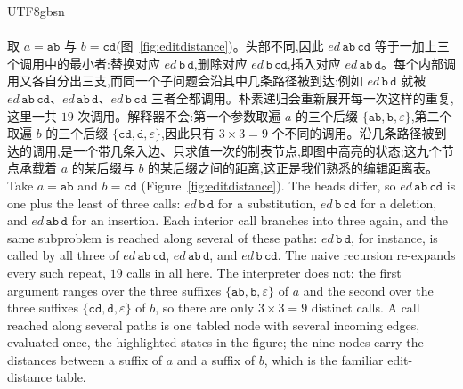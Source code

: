 \begin{CJK*}{UTF8}{gbsn}
  \paragraph{}
  \ifTablambdaChinese
  取 $a=\mathtt{ab}$ 与 $b=\mathtt{cd}$(图~\ref{fig:editdistance})。头部不同,因此 $\mathit{ed}\,\mathtt{ab}\,\mathtt{cd}$ 等于一加上三个调用中的最小者:替换对应 $\mathit{ed}\,\mathtt{b}\,\mathtt{d}$,删除对应 $\mathit{ed}\,\mathtt{b}\,\mathtt{cd}$,插入对应 $\mathit{ed}\,\mathtt{ab}\,\mathtt{d}$。每个内部调用又各自分出三支,而同一个子问题会沿其中几条路径被到达:例如 $\mathit{ed}\,\mathtt{b}\,\mathtt{d}$ 就被 $\mathit{ed}\,\mathtt{ab}\,\mathtt{cd}$、$\mathit{ed}\,\mathtt{ab}\,\mathtt{d}$、$\mathit{ed}\,\mathtt{b}\,\mathtt{cd}$ 三者全都调用。朴素递归会重新展开每一次这样的重复,这里一共 $19$ 次调用。解释器不会:第一个参数取遍 $a$ 的三个后缀 $\{\mathtt{ab},\mathtt{b},\varepsilon\}$,第二个取遍 $b$ 的三个后缀 $\{\mathtt{cd},\mathtt{d},\varepsilon\}$,因此只有 $3\times 3=9$ 个不同的调用。沿几条路径被到达的调用,是一个带几条入边、只求值一次的制表节点,即图中高亮的状态;这九个节点承载着 $a$ 的某后缀与 $b$ 的某后缀之间的距离,这正是我们熟悉的编辑距离表。
  \else
  Take $a=\mathtt{ab}$ and $b=\mathtt{cd}$ (Figure~\ref{fig:editdistance}). The heads differ, so $\mathit{ed}\,\mathtt{ab}\,\mathtt{cd}$ is one plus the least of three calls: $\mathit{ed}\,\mathtt{b}\,\mathtt{d}$ for a substitution, $\mathit{ed}\,\mathtt{b}\,\mathtt{cd}$ for a deletion, and $\mathit{ed}\,\mathtt{ab}\,\mathtt{d}$ for an insertion. Each interior call branches into three again, and the same subproblem is reached along several of these paths: $\mathit{ed}\,\mathtt{b}\,\mathtt{d}$, for instance, is called by all three of $\mathit{ed}\,\mathtt{ab}\,\mathtt{cd}$, $\mathit{ed}\,\mathtt{ab}\,\mathtt{d}$, and $\mathit{ed}\,\mathtt{b}\,\mathtt{cd}$. The naive recursion re-expands every such repeat, $19$ calls in all here. The interpreter does not: the first argument ranges over the three suffixes $\{\mathtt{ab},\mathtt{b},\varepsilon\}$ of $a$ and the second over the three suffixes $\{\mathtt{cd},\mathtt{d},\varepsilon\}$ of $b$, so there are only $3\times 3=9$ distinct calls. A call reached along several paths is one tabled node with several incoming edges, evaluated once, the highlighted states in the figure; the nine nodes carry the distances between a suffix of $a$ and a suffix of $b$, which is the familiar edit-distance table.
  \fi


\end{CJK*}
